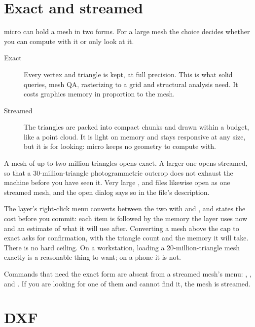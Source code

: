 \section{Exact and streamed}\label{sec:meshes-tiers}

micro can hold a mesh in two forms. For a large mesh the choice decides whether you can compute with it or only look at it.

\begin{description}
\item[Exact] Every vertex and triangle is kept, at full precision. This is what solid queries, mesh QA, rasterizing to a grid and structural analysis need. It costs graphics memory in proportion to the mesh.
\item[Streamed] The triangles are packed into compact chunks and drawn within a budget, like a point cloud. It is light on memory and stays responsive at any size, but it is for looking: micro keeps no geometry to compute with.
\end{description}

A mesh of up to two million triangles opens exact. A larger one opens streamed, so that a 30-million-triangle photogrammetric outcrop does not exhaust the machine before you have seen it. Very large ,  and  files likewise open as one streamed mesh, and the open dialog says so in the file's description.

The layer's right-click menu converts between the two with  and , and states the cost before you commit: each item is followed by the memory the layer uses now and an estimate of what it will use after. Converting a mesh above the cap to exact asks for confirmation, with the triangle count and the memory it will take. There is no hard ceiling. On a workstation, loading a 20-million-triangle mesh exactly is a reasonable thing to want; on a phone it is not.

\begin{note}
Commands that need the exact form are absent from a streamed mesh's  menu: , ,  and . If you are looking for one of them and cannot find it, the mesh is streamed.
\end{note}

\section{DXF}\label{sec:meshes-dxf}

